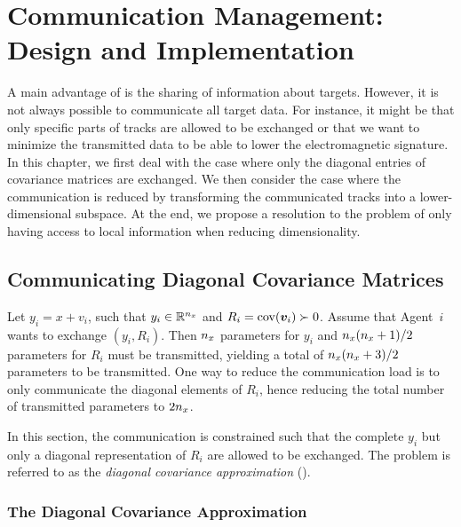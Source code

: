 

\chapter{Communication Management: Design and Implementation} \label{cha:communication}

A main advantage of \abbrDTT is the sharing of information about targets. However, it is not always possible to communicate all target data. For instance, it might be that only specific parts of tracks are allowed to be exchanged or that we want to minimize the transmitted data to be able to lower the electromagnetic signature. In this chapter, we first deal with the case where only the diagonal entries of covariance matrices are exchanged. We then consider the case where the communication is reduced by transforming the communicated tracks into a lower-dimensional subspace. At the end, we propose a resolution to the problem of only having access to local information when reducing dimensionality.





\section{Communicating Diagonal Covariance Matrices}

Let $y_i=x+v_i$, such that $y_i\in{\mathbb{R}}^{n_x}$ and $R_i=\operatorname*{\rm cov}(\bm{v}_i)\succ0$. Assume that Agent~$i$ wants to exchange $(y_i,R_i)$. Then $n_x$ parameters for $y_i$ and $n_x(n_x+1)/2$ parameters for $R_i$ must be transmitted, yielding a total of $n_x(n_x+3)/2$ parameters to be transmitted. One way to reduce the communication load is to only communicate the diagonal elements of $R_i$, hence reducing the total number of transmitted parameters to $2n_x$. 

In this section, the communication is constrained such that the complete $y_i$ but only a diagonal representation of $R_i$ are allowed to be exchanged. The problem is referred to as the \emph{diagonal covariance approximation} (\abbrDCA).


\subsection{The Diagonal Covariance Approximation} \label{sec:dca}

